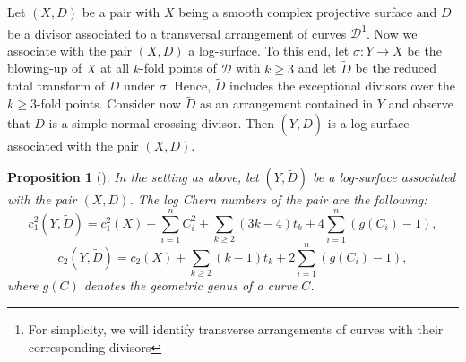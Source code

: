\documentclass{article}
\theoremstyle{plain}
\newtheorem{proposition}[thm]{Proposition}
\theoremstyle{definition}
\numberwithin{equation}{section}
\begin{document}
Let $(X,D)$ be a pair with $X$ being a smooth complex projective surface and $D$ be a divisor associated to a transversal arrangement of curves $\mathcal{D}$\footnote{For simplicity, we will identify transverse arrangements of curves with their corresponding divisors}. Now we associate with the pair $(X,D)$ a log-surface. To this end, let $\sigma : Y \longrightarrow X$ be the blowing-up of $X$ at all $k$-fold points of $\mathcal{D}$ with $k\geq 3$ and let $\widetilde{D}$ be the reduced total transform of $D$ under $\sigma$. Hence, $\widetilde{D}$ includes the exceptional divisors over the $k\geq 3$-fold points. Consider now $\widetilde{D}$ as an arrangement contained in $Y$ and observe that $\widetilde{D}$ is a simple normal crossing divisor. Then $(Y,\widetilde{D})$ is a log-surface associated with the pair $(X, D)$. 
\begin{proposition}[{\cite[p. 27]{Urzua}}]
\label{chernn}
In the setting as above, let $(Y, \widetilde{D})$ be a log-surface associated with the pair $(X,D)$. The log Chern numbers of the pair are the following:
\begin{equation}
\overline{c}_{1}^{2}(Y,\widetilde{D}) = c_{1}^{2}(X) - \sum_{i=1}^{n}C_{i}^{2} + \sum_{k \geq 2} (3k-4)t_{k} + 4\sum_{i=1}^{n}(g(C_{i})-1),
\end{equation}
\begin{equation}
\overline{c}_{2}(Y,\widetilde{D}) = c_{2}(X) + \sum_{k\geq 2}(k-1)t_{k} + 2\sum_{i=1}^{n}(g(C_{i})-1),
\end{equation}
where $g(C)$ denotes the geometric genus of a curve $C$.
\end{proposition}
\end{document}
